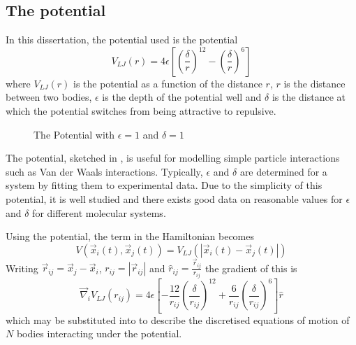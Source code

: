 \subsection{The \LennardJones{} potential}
%
In this dissertation, the \twobody{} potential used is
the \LennardJones{} potential
\begin{equation}
    \label{eqn:the_lennard_jones_potential}
    V_{LJ}(r) = 4\epsilon \left[
        \left( \frac{\delta}{r} \right)^{12}
        - \left( \frac{\delta}{r} \right)^{6}
    \right]
\end  {equation}
where $V_{LJ}(r)$ is the \LennardJones{} potential as
a function of the distance $r$,
$r$ is the distance between two bodies,
$\epsilon$ is the depth of the potential well and
$\delta$ is the distance at which
the potential switches from being attractive to repulsive.

\begin{figure}
    
    \caption{
        The \LennardJones{} Potential with
        $\epsilon = 1$ and $\delta = 1$
    }
    \label{fig:lennard_jones_potential}
\end  {figure}

%
The \LennardJones{} potential, sketched in
,
is useful for modelling simple particle interactions such as
Van der Waals interactions.
%
Typically, $\epsilon$ and $\delta$ are determined for a system by
fitting them to experimental data.
%
Due to the simplicity of this potential,
it is well studied and there exists good data on
reasonable values for $\epsilon$ and $\delta$ for
different molecular systems.

%
Using the \LennardJones{} potential, the \twobody{} term in the Hamiltonian
becomes
\begin{equation}
    V(\vec{x}_i(t), \vec{x}_j(t)) = V_{LJ}(|\vec{x}_i(t) - \vec{x}_j(t)|)
\end  {equation}
%
Writing
$\vec{r}_{ij} = \vec{x}_j - \vec{x}_i$,
$r_{ij} = |\vec{r}_{ij}|$ and
$\hat{r}_{ij} = \frac{\vec{r}_{ij}}{r_{ij}}$
the gradient of this is
\begin{equation}
    \vec{\nabla}_i V_{LJ}(r_{ij}) = 4\epsilon \left[
        - \frac{12}{r_{ij}} \left( \frac{\delta}{r_{ij}} \right)^{12}
        + \frac{6}{r_{ij}} \left( \frac{\delta}{r_{ij}} \right)^{6}
    \right] \hat{r}
\end  {equation}
which may be substituted into  to describe
the discretised equations of motion of $N$ bodies interacting under the
\LennardJones{} potential.


